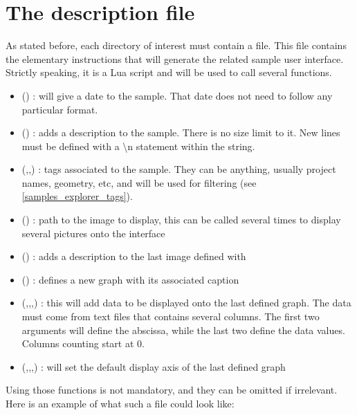 \section{The description file}

As stated before, each directory of interest must contain a  file. This file contains the elementary instructions that will generate the related sample user interface. Strictly speaking, it is a Lua script and will be used to call several functions.
\begin{itemize}
	\item {}() : will give a date to the sample. That date does not need to follow any particular format.
	\item {}() : adds a description to the sample. There is no size limit to it. New lines must be defined with a \textbackslash  n statement within the string.
	\item {}(,,) : tags associated to the sample. They can be anything, usually project names, geometry, etc, and will be used for filtering (see \ref{samples_explorer_tags}).
	\item {}() : path to the image to display, this can be called several times to display several pictures onto the interface
	\item {}() :  adds a description to the last image defined with 
	\item {}() : defines a new graph with its associated caption
	\item {}(,,,) : this will add data to be displayed onto the last defined graph. The data must come from text files that contains several columns. The first two arguments will define the abscissa, while the last two define the data values. Columns counting start at 0.
	 \item {}(,,,) : will set the default display axis of the last defined graph
\end{itemize}
Using those functions is not mandatory, and they can be omitted if irrelevant. Here is an example of what such a file could look like:
